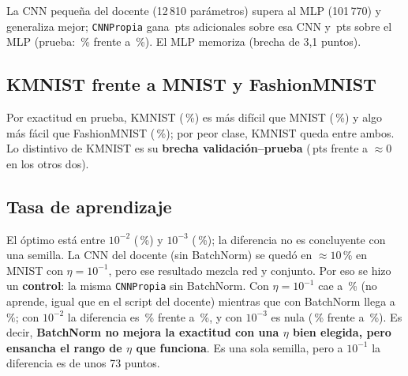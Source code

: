 \documentclass[11pt,letterpaper]{article}
\newcommand{\pts}{\,pts}
\begin{document}
La CNN pequeña del docente (12\,810 parámetros) supera al MLP (101\,770) y generaliza mejor; \texttt{CNNPropia} gana \cifracnnPropVsDoc\pts{} adicionales sobre esa CNN y
\cifracnnPropVsMlp\pts{} sobre el MLP (prueba: \cifracnnPropTe\,\% frente a \ciframlpTe\,\%). El MLP memoriza (brecha de 3,1 puntos).

\subsection{KMNIST frente a MNIST y FashionMNIST}\label{sec:datasets}
\begin{table}[!htbp]
\centering
\caption{La misma \texttt{CNNPropia}, sin cambios, en tres conjuntos (3 semillas).}
\footnotesize

\end{table}

Por exactitud en prueba, KMNIST (\cifradsKMNISTTe\,\%) es más difícil que MNIST (\cifradsMNISTTe\,\%) y algo más fácil que FashionMNIST (\cifradsFashionMNISTTe\,\%); por peor clase, KMNIST queda entre ambos.
Lo distintivo de KMNIST es su \textbf{brecha validación--prueba} (\cifradsKMNISTGap\,pts frente a $\approx 0$ en los otros dos).

\subsection{Tasa de aprendizaje}\label{sec:lr}
\begin{table}[!htbp]
\centering
\caption{Barrido de $\eta$ con Adam, 2 épocas, una semilla (exploratorio), con BatchNorm y sin ella (control).}
\footnotesize

\end{table}

El óptimo está entre $10^{-2}$ (\cifralrDos\,\%) y $10^{-3}$ (\cifralrTres\,\%); la diferencia no es concluyente con una semilla. La CNN del docente (sin BatchNorm) se quedó en $\approx 10$\,\% en MNIST con $\eta = 10^{-1}$, pero ese resultado mezcla red y conjunto. Por eso se hizo un \textbf{control}: la misma \texttt{CNNPropia} sin BatchNorm.
Con $\eta = 10^{-1}$ cae a \cifralrSinBnUno\,\% (no aprende, igual que en el script del docente) mientras que con BatchNorm llega a \cifralrUno\,\%; con $10^{-2}$ la diferencia es \cifralrDos\,\% frente a \cifralrSinBnDos\,\%, y con $10^{-3}$ es nula (\cifralrTres\,\% frente a \cifralrSinBnTres\,\%).
Es decir, \textbf{BatchNorm no mejora la exactitud con una $\eta$ bien elegida, pero ensancha el rango de $\eta$ que funciona}. Es una sola semilla, pero a $10^{-1}$ la diferencia es de unos 73 puntos.
\end{document}
